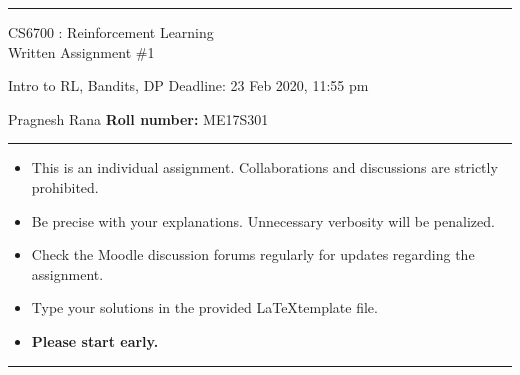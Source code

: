 \documentclass[addpoints,12pt,solution]{exam}
\begin{document}
\hrule
\vspace{1mm}
\noindent 
\begin{center}
{\Large CS6700 : Reinforcement Learning} \\
{\large Written Assignment \#1}
\end{center}
\vspace{1mm}
\noindent 
{\large Intro to RL, Bandits, DP   \hfill Deadline: 23 Feb 2020, 11:55 pm}


 Pragnesh Rana \hfill {\bf Roll number:} ME17S301
\vspace{2mm}
\hrule

{\small

\begin{itemize}\itemsep0mm
\item This is an individual assignment. Collaborations and discussions are strictly
prohibited.
\item Be precise with your explanations. Unnecessary verbosity will be penalized.
\item Check the Moodle discussion forums regularly for updates regarding the assignment.
\item Type your solutions in the provided \LaTeX template file.
\item \textbf{Please start early.}
\end{itemize}
}

\hrule

\vspace{3mm}




\end{document}

